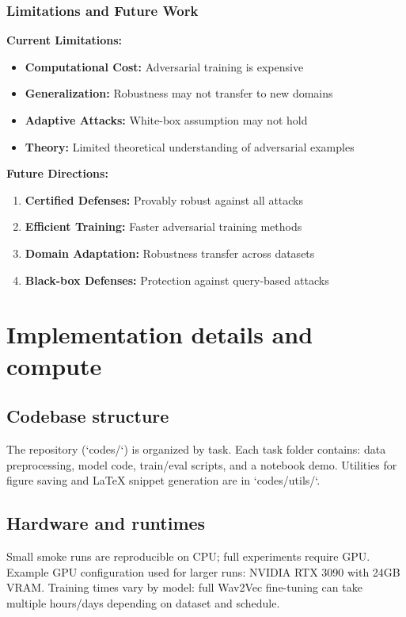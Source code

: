 \documentclass[conference]{IEEEtran}
\begin{document}
\subsubsection{Limitations and Future Work}
\label{sec:q4_limitations}

\textbf{Current Limitations:}
\begin{itemize}
  \item \textbf{Computational Cost:} Adversarial training is expensive
  \item \textbf{Generalization:} Robustness may not transfer to new domains
  \item \textbf{Adaptive Attacks:} White-box assumption may not hold
  \item \textbf{Theory:} Limited theoretical understanding of adversarial examples
\end{itemize}

\textbf{Future Directions:}
\begin{enumerate}[label=\arabic*.]
  \item \textbf{Certified Defenses:} Provably robust against all attacks
  \item \textbf{Efficient Training:} Faster adversarial training methods
  \item \textbf{Domain Adaptation:} Robustness transfer across datasets
  \item \textbf{Black-box Defenses:} Protection against query-based attacks
\end{enumerate}

\section{Implementation details and compute}
\subsection{Codebase structure}
The repository (`codes/`) is organized by task. Each task folder contains: data preprocessing, model code, train/eval scripts, and a notebook demo. Utilities for figure saving and LaTeX snippet generation are in `codes/utils/`.

\subsection{Hardware and runtimes}
Small smoke runs are reproducible on CPU; full experiments require GPU. Example GPU configuration used for larger runs: NVIDIA RTX 3090 with 24GB VRAM. Training times vary by model: full Wav2Vec fine-tuning can take multiple hours/days depending on dataset and schedule.
\end{document}
